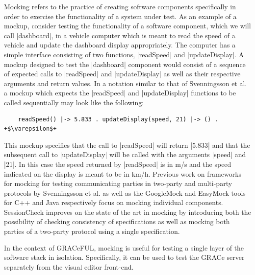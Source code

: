 \documentclass{article}
\begin{document}
Mocking refers to the practice of creating software components specifically
in order to exercise the functionality of a system under test.
%
As an example of a mockup, consider testing the functionality of a software
component, which we will call |dashboard|, in a vehicle computer which is
meant to read the speed of a vehicle and update the dashboard display
appropriately.
%
The computer has a simple interface consisting of two functions,
|readSpeed| and |updateDisplay|.
%
A mockup designed to test the |dashboard| component would consist of a sequence
of expected calls to |readSpeed| and |updateDisplay| as well as their
respective arguments and return values.
%
In a notation similar to that of Svenningsson et al. \cite{HughesMocking}
a mockup which expects the |readSpeed| and |updateDisplay| functions to be
called sequentially may look like the following:
%
\begin{verbatim}
    readSpeed() |-> 5.833 . updateDisplay(speed, 21) |-> () . +$\varepsilon$+
\end{verbatim}
%
This mockup specifies that the call to |readSpeed| will return |5.833| and that
the subsequent call to |updateDisplay| will be called with the arguments
|speed| and |21|.
%
In this case the speed returned by |readSpeed| is in m/s and the speed indicated
on the display is meant to be in km/h.
%
Previous work on frameworks for mocking for testing communicating parties
in two-party and multi-party protocols by Svenningsson et al. \cite{HughesMocking}
as well as the GoogleMock \cite{GoogleMock} and EasyMock \cite{EasyMock} tools
for C++ and Java respectively focus on mocking individual components.
%
SessionCheck improves on the state of the art in mocking by introducing
both the possibility of checking consistency of specifications as well as
mocking both parties of a two-party protocol using a single specification.
%

In the context of GRACeFUL, mocking is useful for testing a single
layer of the software stack in isolation.
%
Specifically, it can be used to test the GRACe server separately from
the visual editor front-end.
\end{document}
